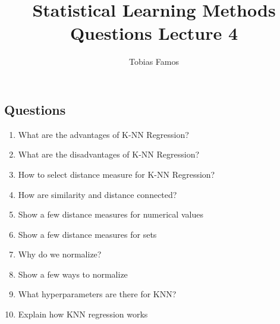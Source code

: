 \documentclass[11pt]{article}
\title{Statistical Learning Methods \\ Questions Lecture 4}
\author{Tobias Famos}
\begin{document}
    \maketitle
    \subsection*{Questions}
    \begin{enumerate}
        \item What are the advantages of K-NN Regression?
        \item What are the disadvantages of K-NN Regression?
        \item How to select distance measure for K-NN Regression?
        \item How are similarity and distance connected?
        \item Show a few distance measures for numerical values
        \item Show a few distance measures for sets
        \item Why do we normalize?
        \item Show a few ways to normalize
        \item What hyperparameters are there for KNN?
        \item Explain how KNN regression works
    \end{enumerate}
    \newpage
\end{document}
